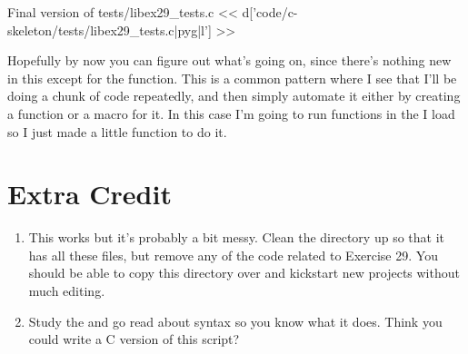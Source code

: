 \begin{code}{Final version of tests/libex29\_tests.c}
<< d['code/c-skeleton/tests/libex29_tests.c|pyg|l'] >>
\end{code}

Hopefully by now you can figure out what's going on, since there's nothing
new in this except for the  function.  This is a common
pattern where I see that I'll be doing a chunk of code repeatedly, and then
simply automate it either by creating a function or a macro for it.  In this
case I'm going to run functions in the  I load so I just made
a little function to do it.

\section{Extra Credit}

\begin{enumerate}
\item This works but it's probably a bit messy.  Clean the  
    directory up so that it has all these files, but remove any of the code
    related to Exercise 29.  You should be able to copy this directory
    over and kickstart new projects without much editing.
\item Study the  and go read about  syntax
    so you know what it does.  Think you could write a C version of this
    script?
\end{enumerate}


